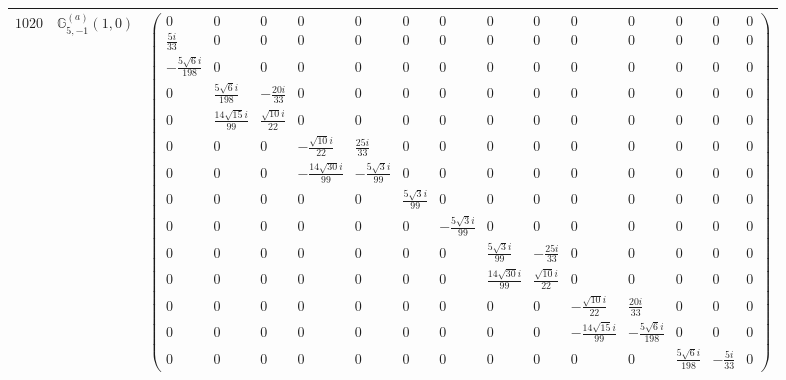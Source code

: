 \documentclass[fleqn,8pt,landscape]{jsarticle}
\begin{document}
\begin{center}
\begin{longtable}{ccc}
$ 1020 $ & $ \mathbb{G}_{5,-1}^{(a)}(1,0) $ & $ \begin{pmatrix} 0 & 0 & 0 & 0 & 0 & 0 & 0 & 0 & 0 & 0 & 0 & 0 & 0 & 0 \\ \frac{5 i}{33} & 0 & 0 & 0 & 0 & 0 & 0 & 0 & 0 & 0 & 0 & 0 & 0 & 0 \\ - \frac{5 \sqrt{6} i}{198} & 0 & 0 & 0 & 0 & 0 & 0 & 0 & 0 & 0 & 0 & 0 & 0 & 0 \\ 0 & \frac{5 \sqrt{6} i}{198} & - \frac{20 i}{33} & 0 & 0 & 0 & 0 & 0 & 0 & 0 & 0 & 0 & 0 & 0 \\ 0 & \frac{14 \sqrt{15} i}{99} & \frac{\sqrt{10} i}{22} & 0 & 0 & 0 & 0 & 0 & 0 & 0 & 0 & 0 & 0 & 0 \\ 0 & 0 & 0 & - \frac{\sqrt{10} i}{22} & \frac{25 i}{33} & 0 & 0 & 0 & 0 & 0 & 0 & 0 & 0 & 0 \\ 0 & 0 & 0 & - \frac{14 \sqrt{30} i}{99} & - \frac{5 \sqrt{3} i}{99} & 0 & 0 & 0 & 0 & 0 & 0 & 0 & 0 & 0 \\ 0 & 0 & 0 & 0 & 0 & \frac{5 \sqrt{3} i}{99} & 0 & 0 & 0 & 0 & 0 & 0 & 0 & 0 \\ 0 & 0 & 0 & 0 & 0 & 0 & - \frac{5 \sqrt{3} i}{99} & 0 & 0 & 0 & 0 & 0 & 0 & 0 \\ 0 & 0 & 0 & 0 & 0 & 0 & 0 & \frac{5 \sqrt{3} i}{99} & - \frac{25 i}{33} & 0 & 0 & 0 & 0 & 0 \\ 0 & 0 & 0 & 0 & 0 & 0 & 0 & \frac{14 \sqrt{30} i}{99} & \frac{\sqrt{10} i}{22} & 0 & 0 & 0 & 0 & 0 \\ 0 & 0 & 0 & 0 & 0 & 0 & 0 & 0 & 0 & - \frac{\sqrt{10} i}{22} & \frac{20 i}{33} & 0 & 0 & 0 \\ 0 & 0 & 0 & 0 & 0 & 0 & 0 & 0 & 0 & - \frac{14 \sqrt{15} i}{99} & - \frac{5 \sqrt{6} i}{198} & 0 & 0 & 0 \\ 0 & 0 & 0 & 0 & 0 & 0 & 0 & 0 & 0 & 0 & 0 & \frac{5 \sqrt{6} i}{198} & - \frac{5 i}{33} & 0 \end{pmatrix} $ \\ \hline

\end{longtable}
\end{center}
\end{document}
